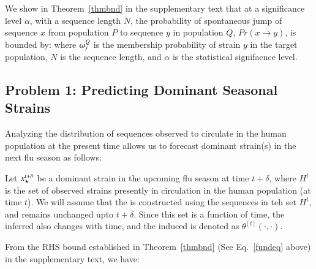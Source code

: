 {We show in Theorem~\ref{thmbnd} in the supplementary text that at a significance level $\alpha$, with a sequence length $N$, the probability of spontaneous jump of sequence $x$ from population $P$ to sequence $y$ in population $Q$, $Pr(x \rightarrow y)$, is bounded by:
where $\omega_{y}^Q$ is the membership probability of strain $y$ in the target population, $N$ is the sequence length, and $\alpha$ is the statistical signifacnce level.


\subsection*{Problem 1: Predicting Dominant Seasonal Strains} 

Analyzing the distribution of sequences observed to circulate in the human population at the present time allows us to forecast dominant strain(s) in the next flu season as follows:

Let $x_\star^{t+\delta}$ be a dominant strain in the upcoming flu season at time $t+\delta$,
where $H^t$ is the set of observed strains presently in circulation in the human population (at time $t$). We will assume that the \enet is constructed using the sequences in teh set $H^t$, and remains unchanged upto $t+\delta$. Since this set is a function of time, the inferred \enet also changes with time, and the induced \qdist is denoted as $\theta^{[t]}(\cdot,\cdot)$.

From the RHS bound established in Theorem~\ref{thmbnd} (See Eq.~\eqref{fundeq} above) in the supplementary text, we have:
%
%
%
}

